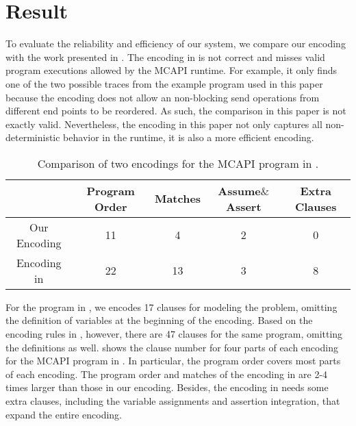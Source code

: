 \section{Result}
To evaluate the reliability and efficiency of our system, we compare our encoding with the work presented in \cite{elwakil:padtad10}.
The encoding in \cite{elwakil:padtad10} is not correct and misses valid program executions allowed by the MCAPI runtime. For example, it only finds one of the two possible traces from the example program used in this paper because the encoding does not allow an non-blocking send operations from different end points to be reordered. As such, the comparison in this paper is not exactly valid. Nevertheless, the encoding in this paper not only captures all non-deterministic behavior in the runtime, it is also a more efficient encoding.

\begin{table}
\begin{center}
\begin{tabular}{|c|c|c|c|c|}
    \hline
     & Program Order & Matches & Assume$\&$Assert & Extra Clauses\\
    \hline
    Our Encoding  & 11 & 4 & 2 & 0\\
    Encoding in \cite{elwakil:padtad10} & 22 & 13 & 3 & 8\\
    \hline
\end{tabular}
\end{center}
\caption{Comparison of two encodings for the MCAPI program in .}
\label{table:program}
\end{table}

For the program in , we encodes 17 clauses for modeling the problem, omitting the definition of variables at the beginning of the encoding. Based on the encoding rules in \cite{elwakil:padtad10}, however, there are 47 clauses for the same program, omitting the definitions as well.  shows the clause number for four parts of each encoding for the MCAPI program in . In particular, the program order covers most parts of each encoding. The program order and matches of the encoding in \cite{elwakil:padtad10} are 2-4 times larger than those in our encoding. Besides, the encoding in \cite{elwakil:padtad10} needs some extra clauses, including the variable assignments and assertion integration, that expand the entire encoding.

